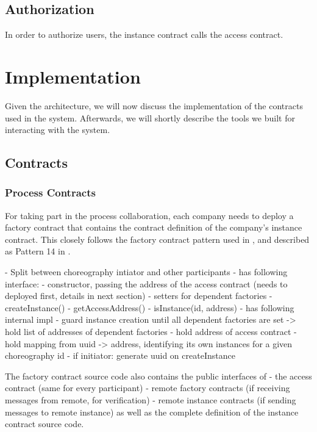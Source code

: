\documentclass[runningheads]{llncs}
\begin{document}
\subsection{Authorization}
In order to authorize users, the instance contract calls the access contract.

\section{Implementation}

Given the architecture, we will now discuss the implementation of the contracts used in the system.
Afterwards, we will shortly describe the tools we built for interacting with the system.

\subsection{Contracts}

\subsubsection{Process Contracts}

For taking part in the process collaboration, each company needs to deploy a factory contract that contains the contract definition of the company's instance contract.
This closely follows the factory contract pattern used in \cite{weber2016untrusted}, and described as Pattern 14 in \cite{xu2018pattern}.

- Split between choreography intiator and other participants
- has following interface:
- constructor, passing the address of the access contract (needs to deployed first, details in next section)
- setters for dependent factories
- createInstance()
- getAccessAddress()
- isInstance(id, address)
- has following internal impl
- guard instance creation until all dependent factories are set
-> hold list of addresses of dependent factories
- hold address of access contract
- hold mapping from uuid -> address, identifying its own instances for a given choreography id
- if initiator: generate uuid on createInstance

The factory contract source code also contains the public interfaces of
- the access contract (same for every participant)
- remote factory contracts (if receiving messages from remote, for verification)
- remote instance contracts (if sending messages to remote instance)
as well as the complete definition of the instance contract source code.
\end{document}

